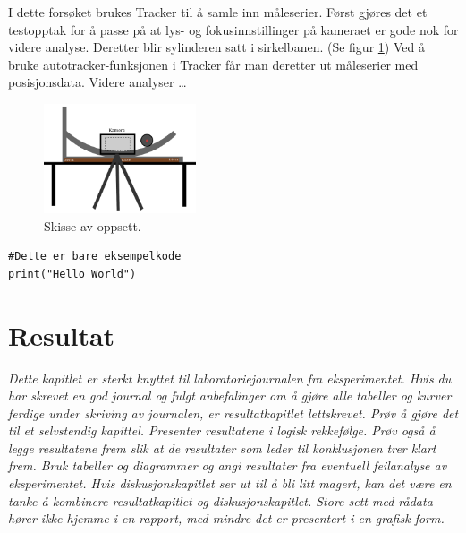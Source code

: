 \documentclass[5p]{elsarticle}
\newcommand{\enhet}[1]{~\mathrm{#1}}  %
\begin{document}
I dette forsøket brukes Tracker til å samle inn måleserier. 
Først gjøres det et testopptak for å passe på at lys- og fokusinnstillinger på kameraet er gode nok for videre analyse.
Deretter blir sylinderen satt i sirkelbanen. (Se figur \ref{Fig Oppsett})
Ved å bruke autotracker-funksjonen i Tracker får man deretter ut måleserier med posisjonsdata.
Videre analyser \dots  

\begin{figure}[] 
	\begin{center}
		\includegraphics[width=0.4\textwidth]{skisse}
	\end{center}
	\caption{Skisse av oppsett.}
	\label{Fig Oppsett} %
\end{figure}

\begin{verbatim}
#Dette er bare eksempelkode
print("Hello World")
\end{verbatim}

\section{Resultat}

\textit{
Dette kapitlet er sterkt knyttet til laboratoriejournalen fra eksperimentet. Hvis du har skrevet en god journal og
fulgt anbefalinger om å gjøre alle tabeller og kurver ferdige under skriving av journalen, er resultatkapitlet lettskrevet. 
Prøv å gjøre det til et selvstendig kapittel. Presenter resultatene i logisk rekkefølge. Prøv også å legge resultatene frem
slik at de resultater som leder til konklusjonen trer klart frem. Bruk tabeller og diagrammer og angi resultater fra
eventuell feilanalyse av eksperimentet.  Hvis diskusjonskapitlet ser ut til å bli litt magert, kan det være en tanke å
kombinere resultatkapitlet og diskusjonskapitlet. Store sett med rådata hører ikke hjemme i en rapport, med mindre det er
presentert i en grafisk form.
}

\end{document}
